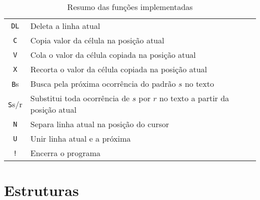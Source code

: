 \documentclass[a4paper, 11pt]{article}
\begin{document}
\begin{table}[H]
\begin{tabularx}{\linewidth}{|c|X|}
      \texttt{DL} &  Deleta a linha atual\\
      \texttt{ C } &  Copia valor da célula na posição atual\\
      \texttt{ V } &  Cola o valor da célula copiada na posição atual \\
      \texttt{ X } &  Recorta o valor da célula copiada na posição atual\\
      \texttt{B}s &  Busca pela próxima ocorrência do padrão $s$ no texto\\
      \texttt{S}s/r &  Substitui toda ocorrência de $s$ por $r$ no texto a partir da posição atual\\
      \texttt{ N } &  Separa linha atual na posição do cursor\\
      \texttt{ U } &  Unir linha atual e a próxima \\
      \texttt{!} &  Encerra o programa \\
      \hline
      \end{tabularx}
      \caption*{Resumo das funções implementadas}
\end{table}

\tableofcontents

\section{Estruturas}
\end{document}
